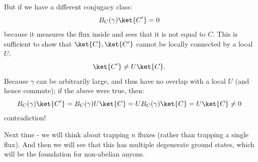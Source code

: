 But if we have a different conjugacy class:
\begin{equation}
    B_C(\gamma)\ket{C'} = 0
\end{equation}
because it measures the flux inside and sees that it is not equal to $C$. This is sufficient to show that $\ket{C}, \ket{C'}$ cannot be locally connected by a local $U$:
\begin{equation}
    \ket{C'} \neq U\ket{C}.
\end{equation}
Because $\gamma$ can be arbitrarily large, and thus have no overlap with a local $U$ (and hence commute); if the above were true, then:
\begin{equation}
    B_C(\gamma)\ket{C'} = B_C(\gamma)U\ket{C} = UB_C(\gamma)\ket{C} = U\ket{C} \neq 0
\end{equation}
contradiction!

Next time - we will think about trapping $n$ fluxes (rather than trapping a single flux). And then we will see that this has multiple degenerate ground states, which will be the foundation for non-abelian anyons.
